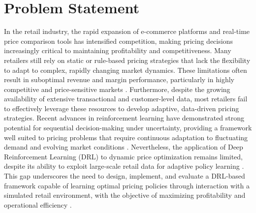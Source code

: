 \chapter{Problem Statement}
In the retail industry, the rapid expansion of e-commerce platforms and real-time price comparison tools has intensified competition, making pricing decisions increasingly critical to maintaining profitability and competitiveness. Many retailers still rely on static or rule-based pricing strategies that lack the flexibility to adapt to complex, rapidly changing market dynamics. These limitations often result in suboptimal revenue and margin performance, particularly in highly competitive and price-sensitive markets \cite{bauer2018optimal, zhu2024drl}. Furthermore, despite the growing availability of extensive transactional and customer-level data, most retailers fail to effectively leverage these resources to develop adaptive, data-driven pricing strategies. Recent advances in reinforcement learning have demonstrated strong potential for sequential decision-making under uncertainty, providing a framework well suited to pricing problems that require continuous adaptation to fluctuating demand and evolving market conditions \cite{cai2022survey, qiao2024distributed}. Nevertheless, the application of Deep Reinforcement Learning (DRL) to dynamic price optimization remains limited, despite its ability to exploit large-scale retail data for adaptive policy learning \cite{liu2019dynamic}. This gap underscores the need to design, implement, and evaluate a DRL-based framework capable of learning optimal pricing policies through interaction with a simulated retail environment, with the objective of maximizing profitability and operational efficiency \cite{zhu2024drl}.

